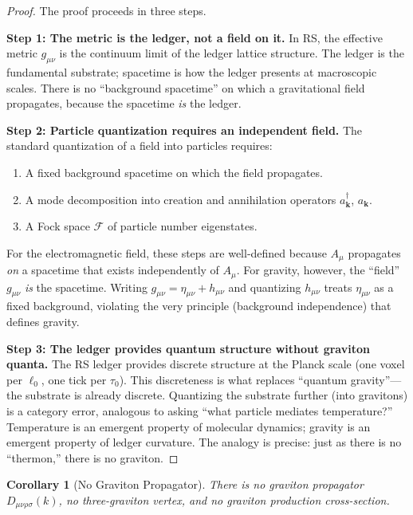 \documentclass[12pt,a4paper]{article}
\newtheorem{corollary}[theorem]{Corollary}
\theoremstyle{definition}
\theoremstyle{remark}
\begin{document}
\begin{proof}
The proof proceeds in three steps.

\textbf{Step 1: The metric is the ledger, not a field on it.}
In RS, the effective metric $g_{\mu\nu}$ is the continuum limit
of the ledger lattice structure.  The ledger is the fundamental
substrate; spacetime is how the ledger presents at macroscopic
scales.  There is no ``background spacetime'' on which a
gravitational field propagates, because the spacetime \emph{is}
the ledger.

\textbf{Step 2: Particle quantization requires an independent
field.}
The standard quantization of a field into particles requires:
\begin{enumerate}[label=(\roman*)]
  \item A fixed background spacetime on which the field propagates.
  \item A mode decomposition into creation and annihilation
        operators $a_{\mathbf{k}}^{\dagger}$, $a_{\mathbf{k}}$.
  \item A Fock space $\mathcal{F}$ of particle number eigenstates.
\end{enumerate}
For the electromagnetic field, these steps are well-defined
because $A_{\mu}$ propagates \emph{on} a spacetime that exists
independently of $A_{\mu}$.  For gravity, however, the ``field''
$g_{\mu\nu}$ \emph{is} the spacetime.  Writing
$g_{\mu\nu} = \eta_{\mu\nu} + h_{\mu\nu}$ and quantizing
$h_{\mu\nu}$ treats $\eta_{\mu\nu}$ as a fixed background,
violating the very principle (background independence) that
defines gravity.

\textbf{Step 3: The ledger provides quantum structure without
graviton quanta.}
The RS ledger provides discrete structure at the Planck scale
(one voxel per $\ell_0$, one tick per $\tau_0$).  This
discreteness is what replaces ``quantum gravity''---the substrate
is already discrete.  Quantizing the substrate further (into
gravitons) is a category error, analogous to asking
``what particle mediates temperature?''  Temperature is an
emergent property of molecular dynamics; gravity is an emergent
property of ledger curvature.  The analogy is precise: just as
there is no ``thermon,'' there is no graviton.
\end{proof}

\begin{corollary}[No Graviton Propagator]
\label{cor:no-propagator}
There is no graviton propagator $D_{\mu\nu\rho\sigma}(k)$, no
three-graviton vertex, and no graviton production cross-section.
\end{corollary}
\end{document}
